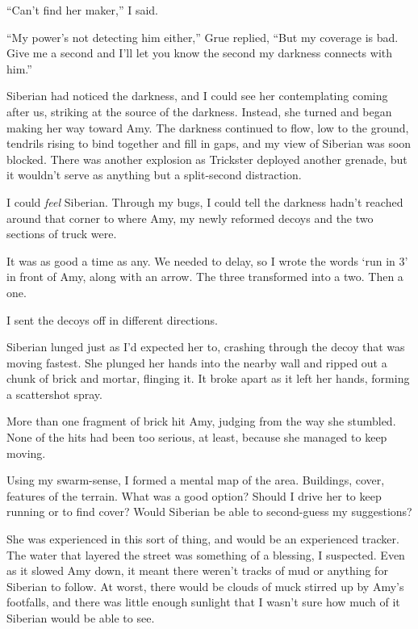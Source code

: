 ``Can't find her maker,'' I said.



``My power's not detecting him either,'' Grue replied, ``But my coverage is bad.  Give me a second and I'll let you know the second my darkness connects with him.''



Siberian had noticed the darkness, and I could see her contemplating coming after us, striking at the source of the darkness.  Instead, she turned and began making her way toward Amy.  The darkness continued to flow, low to the ground, tendrils rising to bind together and fill in gaps, and my view of Siberian was soon blocked.  There was another explosion as Trickster deployed another grenade, but it wouldn't serve as anything but a split-second distraction.



I could \emph{feel} Siberian.  Through my bugs, I could tell the darkness hadn't reached around that corner to where Amy, my newly reformed decoys and the two sections of truck were.



It was as good a time as any.  We needed to delay, so I wrote the words `run in 3' in front of Amy, along with an arrow.  The three transformed into a two.  Then a one.



I sent the decoys off in different directions.



Siberian lunged just as I'd expected her to, crashing through the decoy that was moving fastest.  She plunged her hands into the nearby wall and ripped out a chunk of brick and mortar, flinging it.  It broke apart as it left her hands, forming a scattershot spray.



More than one fragment of brick hit Amy, judging from the way she stumbled.  None of the hits had been too serious, at least, because she managed to keep moving.



Using my swarm-sense, I formed a mental map of the area.  Buildings, cover, features of the terrain.  What was a good option?  Should I drive her to keep running or to find cover?  Would Siberian be able to second-guess my suggestions?



She was experienced in this sort of thing, and would be an experienced tracker.  The water that layered the street was something of a blessing, I suspected.  Even as it slowed Amy down, it meant there weren't tracks of mud or anything for Siberian to follow.  At worst, there would be clouds of muck stirred up by Amy's footfalls, and there was little enough sunlight that I wasn't sure how much of it Siberian would be able to see.



